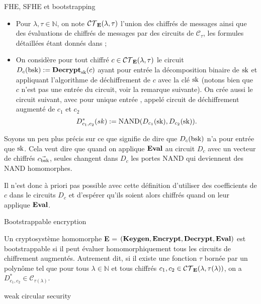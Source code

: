 \begin{section}{FHE, SFHE et bootstrapping}
\begin{itemize}
\item Pour $\lambda, \tau \in \mathbb{N}$, on note
$\mathcal{CT}_{\text{\textbf{E}}}(\lambda,\tau)$ l'union des chiffrés de messages 
ainsi que des évaluations de chiffrés de messages par des circuits de 
$\mathcal{C}_\tau$, les formules détaillées étant donnés dans \cite{halevi};
\item On considère pour tout chiffré $c\in\mathcal{CT}_{\text{\textbf{E}}}(\lambda,\tau)$ 
le circuit $D_c(\text{bsk}) := \text{\textbf{Decrypt}}_{\text{sk}}(c)$ ayant pour entrée la décomposition binaire 
de $\text{sk}$ et appliquant l'algorithme de déchiffrement de $c$ avec la clé $\text{sk}$ (notons bien que $c$ n'est pas une entrée
du circuit, voir la remarque suivante). On crée aussi le circuit suivant, avec pour
unique entrée \sk, appelé circuit de déchiffrement augmenté de $c_1$ et $c_2$
\[ D^*_{c_1,c_2}(sk) := \text{NAND}(D_{c_1}(\text{sk}), D_{c_2}(\text{sk})).\]
\end{itemize}
\begin{rmq}
Soyons un peu plus précis sur ce que signifie de dire que $D_c(\text{bsk})$
n'a pour entrée que $\text{sk}$. Cela veut dire que quand on applique 
$\text{\textbf{Eval}}$ au circuit $D_c$ avec un vecteur de chiffrés $\vec{c_{\text{bsk}}}$,
seules changent dans $D_c$ les portes NAND qui deviennent des 
NAND homomorphes. 

Il n'est donc à priori pas possible avec cette définition 
d'utiliser des coefficients de $c$ dans le circuits $D_c$ 
et d'espérer qu'ils soient alors chiffrés quand on leur applique $\text{\textbf{Eval}}$.
\end{rmq}

\begin{definition}{Bootstrappable encryption}

Un cryptosystème homomorphe
\textbf{E} = $(\text{\textbf{Keygen}}, \text{\textbf{Encrypt}}, \text{\textbf{Decrypt}}, \text{\textbf{Eval}})$
est bootstrappable si il peut évaluer homomorphiquement tous les circuits 
de chiffrement augmentés. Autrement dit, si il existe une fonction $\tau$
bornée par un polynôme tel que pour tous $\lambda \in \mathbb{N}$ et tous
chiffrés  $c_1, c_2 \in \mathcal{CT}_{\text{\textbf{E}}}(\lambda, \tau(\lambda))$, on a
$D^*_{c_1,c_2} \in \mathcal{C}_{\tau(\lambda)}$.
\end{definition}

\begin{definition}{weak circular security}


\end{definition}
\end{section}
